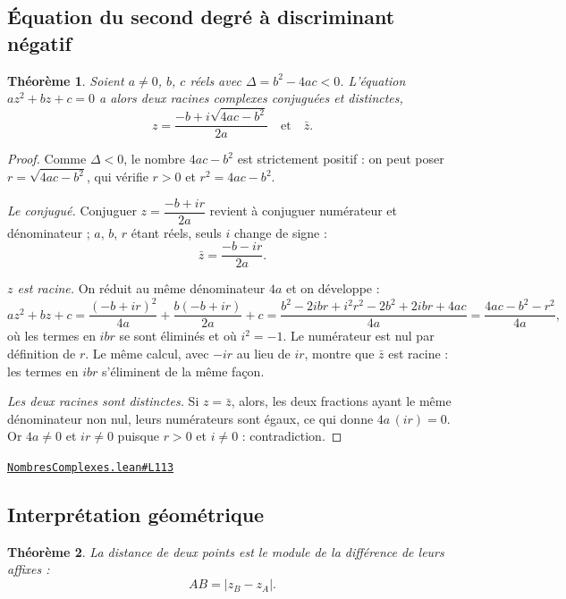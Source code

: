 \documentclass[11pt,a4paper]{article}
\theoremstyle{definition}
\theoremstyle{plain}
\newtheorem{theoreme}{Théorème}
\newcommand{\source}[2]{\par\smallskip\noindent\hfill{\footnotesize\href{#1}{\texttt{#2}}}\par\smallskip}
\begin{document}
\subsection{Équation du second degré à discriminant négatif}

\begin{theoreme}
Soient $a \ne 0$, $b$, $c$ réels avec $\Delta = b^{2} - 4ac < 0$. L'équation
$az^{2} + bz + c = 0$ a alors deux racines complexes conjuguées et distinctes,
\[ z = \frac{-b + i\sqrt{4ac - b^{2}}}{2a} \quad\text{et}\quad \bar z . \]
\end{theoreme}

\begin{proof}
Comme $\Delta < 0$, le nombre $4ac - b^{2}$ est strictement positif : on peut poser
$r = \sqrt{4ac - b^{2}}$, qui vérifie $r > 0$ et $r^{2} = 4ac - b^{2}$.

\smallskip\noindent
\emph{Le conjugué.} Conjuguer $z = \dfrac{-b + ir}{2a}$ revient à conjuguer numérateur et
dénominateur ; $a$, $b$, $r$ étant réels, seuls $i$ change de signe :
\[ \bar z = \frac{-b - ir}{2a} . \]

\smallskip\noindent
\emph{$z$ est racine.} On réduit au même dénominateur $4a$ et on développe :
\[ a z^{2} + b z + c
   = \frac{(-b + ir)^{2}}{4a} + \frac{b(-b + ir)}{2a} + c
   = \frac{b^{2} - 2ibr + i^{2}r^{2} - 2b^{2} + 2ibr + 4ac}{4a}
   = \frac{4ac - b^{2} - r^{2}}{4a} , \]
où les termes en $ibr$ se sont éliminés et où $i^{2} = -1$. Le numérateur est nul par
définition de $r$. Le même calcul, avec $-ir$ au lieu de $ir$, montre que $\bar z$ est
racine : les termes en $ibr$ s'éliminent de la même façon.

\smallskip\noindent
\emph{Les deux racines sont distinctes.} Si $z = \bar z$, alors, les deux fractions ayant
le même dénominateur non nul, leurs numérateurs sont égaux, ce qui donne
$4a\,(ir) = 0$. Or $4a \ne 0$ et $ir \ne 0$ puisque $r > 0$ et $i \ne 0$ : contradiction.
\end{proof}
\source{https://github.com/Commutator-IO/learn-lean/blob/main/cours/02-lycee/07-nombres-complexes/NombresComplexes.lean\#L113}{NombresComplexes.lean\#L113}

\subsection{Interprétation géométrique}

\begin{theoreme}
La distance de deux points est le module de la différence de leurs affixes :
\[ AB = |z_B - z_A| . \]
\end{theoreme}
\end{document}
